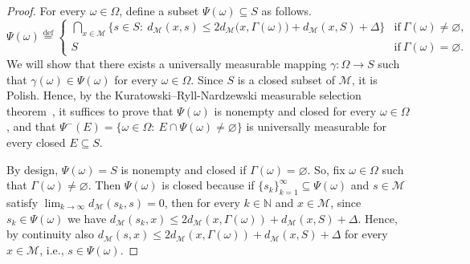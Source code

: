 \documentclass[11pt,reqno]{amsart}
\renewcommand{\le}{\leqslant}
\theoremstyle{remark}
\newcommand{\MM}{\mathcal{M}}
\renewcommand{\subset}{\subseteq}
\newcommand{\N}{\mathbb N}
\newcommand{\eqdef}{\stackrel{\mathrm{def}}{=}}
\renewcommand{\emptyset}{\varnothing}
\renewcommand{\1}{\mathbf 1}
\begin{document}
\begin{proof} For every $\omega\in \Omega$, define a subset $\Psi(\omega)\subset S$ as follows.
\begin{equation}\label{eq:def Psi}
\Psi(\omega)\eqdef \left\{\begin{array}{cl}
\bigcap_{x\in \MM}\big\{s\in S:\ d_\MM(x,s)\le 2d_\MM\big(x,\Gamma(\omega)\big)+d_\MM(x,S)+\Delta\big\}&\mathrm{if}\ \Gamma(\omega)\neq\emptyset,\\
S&\mathrm{if}\ \Gamma(\omega)=\emptyset.
\end{array}\right.
\end{equation}
We will show  that there exists a universally measurable mapping $\gamma:\Omega\to S$ such that $\gamma(\omega)\in \Psi(\omega)$ for every $\omega\in \Omega$. Since $S$ is a closed subset of $\MM$, it is Polish. Hence,  by the Kuratowski--Ryll-Nardzewski measurable selection theorem~\cite{KR65}, it suffices to prove that $\Psi(\omega)$ is nonempty and closed for every $\omega\in \Omega$, and  that $\Psi^-(E)=\{\omega\in \Omega:\ E\cap \Psi(\omega)\neq \emptyset\}$ is  universally measurable for every closed  $E\subset S$.



By design, $\Psi(\omega)=S$ is nonempty and closed if $\Gamma(\omega)= \emptyset$. So, fix $\omega\in \Omega$ such that $\Gamma(\omega)\neq \emptyset$. Then $\Psi(\omega)$ is closed because if $\{s_k\}_{k=1}^\infty\subset \Psi(\omega)$ and $s\in \MM$ satisfy $\lim_{k\to \infty} d_\MM(s_k,s)=0$, then for every $k\in \N$ and $x\in \MM$, since $s_k\in \Psi(\omega)$ we have  $d_\MM(s_k,x)\le 2d_\MM(x,\Gamma(\omega))+d_\MM(x,S)+\Delta$. Hence, by continuity also $d_\MM(s,x)\le 2d_\MM(x,\Gamma(\omega))+d_\MM(x,S)+\Delta$ for every $x\in \MM$, i.e., $s\in \Psi(\omega)$.


\end{proof}
\end{document}

